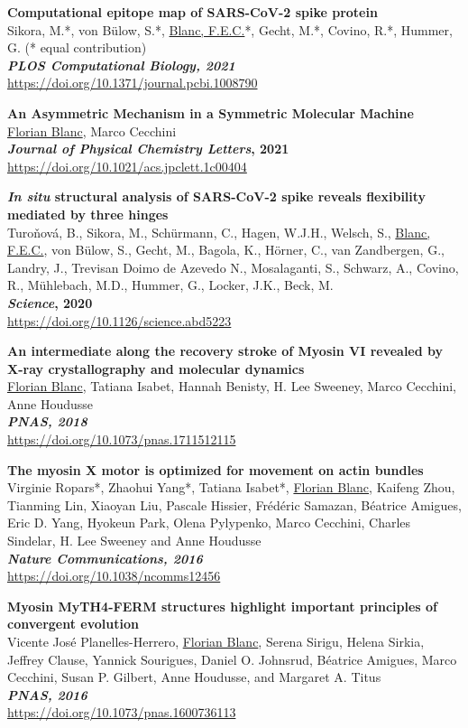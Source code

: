 \textbf{Computational epitope map of SARS-CoV-2 spike protein}\\
Sikora, M.*, von Bülow, S.*, \underline{Blanc, F.E.C.}*, Gecht, M.*, Covino, R.*, Hummer, G. (* equal contribution)\\
\textbf{\textit{PLOS Computational Biology, 2021}}\\
\url{https://doi.org/10.1371/journal.pcbi.1008790}
\vskip 0.1cm

\textbf{An Asymmetric Mechanism in a Symmetric Molecular Machine}\\
\underline{Florian Blanc}, Marco Cecchini\\
\textbf{\textit{Journal of Physical Chemistry Letters}, 2021}\\
\url{https://doi.org/10.1021/acs.jpclett.1c00404}
\vskip 0.1cm

\textbf{\textit{In situ} structural analysis of SARS-CoV-2 spike reveals flexibility mediated by three hinges}\\
Turoňová, B., Sikora, M., Schürmann, C., Hagen, W.J.H., Welsch, S., \underline{Blanc, F.E.C.}, von Bülow, S., Gecht, M., Bagola, K., Hörner, C., van Zandbergen, G., Landry, J., Trevisan Doimo de Azevedo N., Mosalaganti, S., Schwarz, A., Covino, R., Mühlebach, M.D., Hummer, G., Locker, J.K., Beck, M.\\
\textbf{\textit{Science}, 2020}\\
\url{https://doi.org/10.1126/science.abd5223}
\vskip 0.1cm

\textbf{An intermediate along the recovery stroke of Myosin VI revealed by X-ray crystallography {and molecular dynamics}}\\
\underline{Florian Blanc}, Tatiana Isabet, Hannah Benisty, H. Lee Sweeney, Marco Cecchini, Anne Houdusse\\
\textbf{\textit{PNAS, 2018}}\\
\url{https://doi.org/10.1073/pnas.1711512115}
\vskip 0.1cm

\textbf{The myosin X motor is optimized for movement on actin bundles}\\
Virginie Ropars*, Zhaohui Yang*, Tatiana Isabet*, \underline{Florian Blanc}, Kaifeng Zhou, Tianming Lin, Xiaoyan Liu, Pascale Hissier, Fr\'ed\'eric Samazan, B\'eatrice Amigues, Eric D. Yang, Hyokeun Park, Olena Pylypenko, Marco Cecchini, Charles Sindelar, H. Lee Sweeney and Anne Houdusse\\
\textbf{\textit{Nature Communications, 2016}}\\
\url{https://doi.org/10.1038/ncomms12456}
\vskip 0.1cm

\textbf{Myosin MyTH4-FERM structures highlight important principles of convergent evolution}\\
Vicente Jos\'e Planelles-Herrero, \underline{Florian Blanc}, Serena Sirigu, Helena Sirkia, Jeffrey Clause, Yannick Sourigues, Daniel O. Johnsrud, B\'eatrice Amigues, Marco Cecchini, Susan P. Gilbert, Anne Houdusse, and Margaret A. Titus\\
\textbf{\textit{PNAS, 2016}}\\
\url{https://doi.org/10.1073/pnas.1600736113}
\vskip 0.05cm
